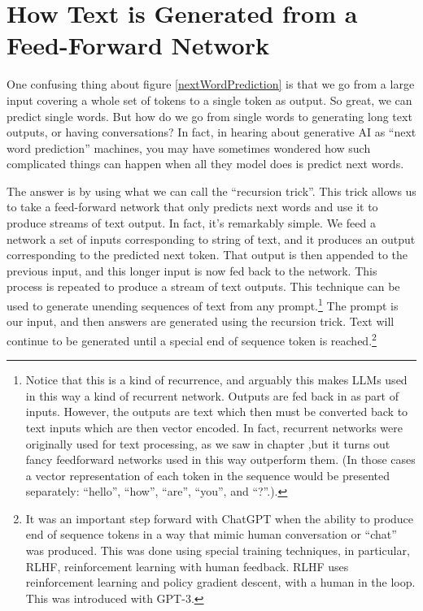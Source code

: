 \section{How Text is Generated from a Feed-Forward Network}


One confusing thing about figure \ref{nextWordPrediction} is that we go from a large input covering a whole set of tokens to a single token as output. So great, we can predict single words. But how do we go from single words to generating long text outputs, or having conversations? In fact, in hearing about generative AI as ``next word prediction'' machines, you may have sometimes wondered how such complicated things can happen when all they model does is predict next words.

The answer is by using what we can call the ``recursion trick''. This trick allows us to take a feed-forward network that only predicts next words and use it to produce streams of text output. In fact, it's remarkably simple. We feed a network a set of inputs corresponding to string of text, and it produces an output corresponding to the predicted next token. That output is then appended to the previous input, and this longer input is now fed back to the network. This process is repeated to produce a stream of text outputs. This technique can be used to generate unending sequences of text from any prompt.\footnote{Notice that this is a kind of recurrence, and arguably this makes LLMs used in this way a kind of recurrent network. Outputs are fed back in as part of inputs. However, the outputs are text which then must be converted back to text inputs which are then vector encoded. In fact, recurrent networks were originally used for text processing, as we saw in chapter ,but it turns out fancy feedforward networks used in this way outperform them. (In those cases a vector representation of each token in the sequence would be presented separately: ``hello'', ``how'', ``are'', ``you'', and ``?''.).} The prompt is our input, and then answers are generated using the recursion trick. Text will continue to be generated until a special end of sequence token is reached.\footnote{It was an important step forward with ChatGPT when the ability to produce end of sequence tokens in a way that mimic human conversation or ``chat'' was produced. This was done using special training techniques, in particular, RLHF, reinforcement learning with human feedback. RLHF uses reinforcement learning and policy gradient descent, with a human in the loop. This was introduced with GPT-3.} 

